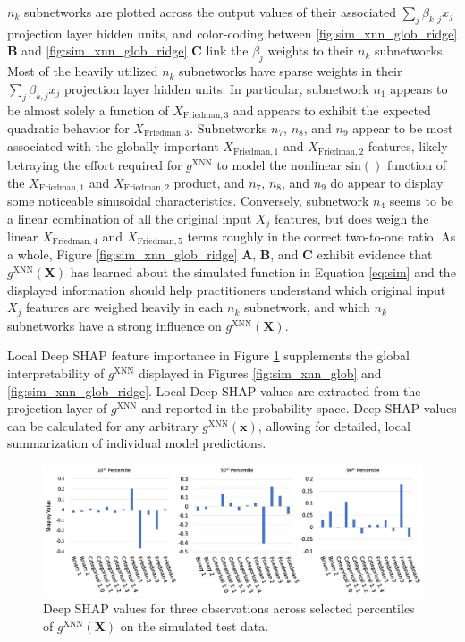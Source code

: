 \documentclass[information,article,submit,moreauthors,pdftex]{definitions/mdpi}
\begin{document}
\noindent $n_k$ subnetworks are plotted across the output values of their associated $\sum_j\beta_{k,j}x_j$ projection layer hidden units, and color-coding between \ref{fig:sim_xnn_glob_ridge} \textbf{B} and \ref{fig:sim_xnn_glob_ridge} \textbf{C} link the $\beta_j$ weights to their $n_k$ subnetworks. Most of the heavily utilized $n_k$ subnetworks have sparse weights in their $\sum_j\beta_{k,j}x_j$ projection layer hidden units. In particular, subnetwork $n_1$ appears to be almost solely a function of $X_{\text{Friedman}, 3}$ and appears to exhibit the expected quadratic behavior for $X_{\text{Friedman}, 3}$.  Subnetworks $n_7$, $n_8$, and $n_9$ appear to be most associated with the globally important $X_{\text{Friedman}, 1}$ and $X_{\text{Friedman}, 2}$ features, likely betraying the effort required for $g^{\text{XNN}}$ to model the nonlinear $\text{sin}()$ function of the $X_{\text{Friedman}, 1}$ and $X_{\text{Friedman}, 2}$ product, and $n_7$, $n_8$, and $n_9$ do appear to display some noticeable sinusoidal characteristics.  Conversely, subnetwork $n_4$ seems to be a linear combination of all the original input $X_j$ features, but does weigh the linear $X_{\text{Friedman},4}$ and $X_{\text{Friedman},5}$ terms roughly in the correct two-to-one ratio. As a whole, Figure \ref{fig:sim_xnn_glob_ridge} \textbf{A}, \textbf{B}, and \textbf{C} exhibit evidence that $g^\text{XNN}(\mathbf{X})$ has learned about the simulated function in Equation \ref{eq:sim} and the displayed information should help practitioners understand which original input $X_j$ features are weighed heavily in each $n_k$ subnetwork, and which $n_k$ subnetworks have a strong influence on $g^\text{XNN}(\mathbf{X})$. 

Local Deep SHAP feature importance in Figure \ref{fig:sim_xnn_loc} supplements the global interpretability of $g^\text{XNN}$ displayed in Figures \ref{fig:sim_xnn_glob} and \ref{fig:sim_xnn_glob_ridge}. Local Deep SHAP values are extracted from the projection layer of $g^\text{XNN}$ and reported in the probability space. Deep SHAP values can be calculated for any arbitrary $g^\text{XNN}(\mathbf{x})$, allowing for detailed, local summarization of individual model predictions. 
 
\begin{figure}[H]
\centering
\includegraphics[width=15cm]{img/sim_xnn_loc.png}
\caption{Deep SHAP values for three observations across selected percentiles of $g^\text{XNN}(\mathbf{X})$ on the simulated test data.}
\label{fig:sim_xnn_loc}
\end{figure}  
\end{document}
